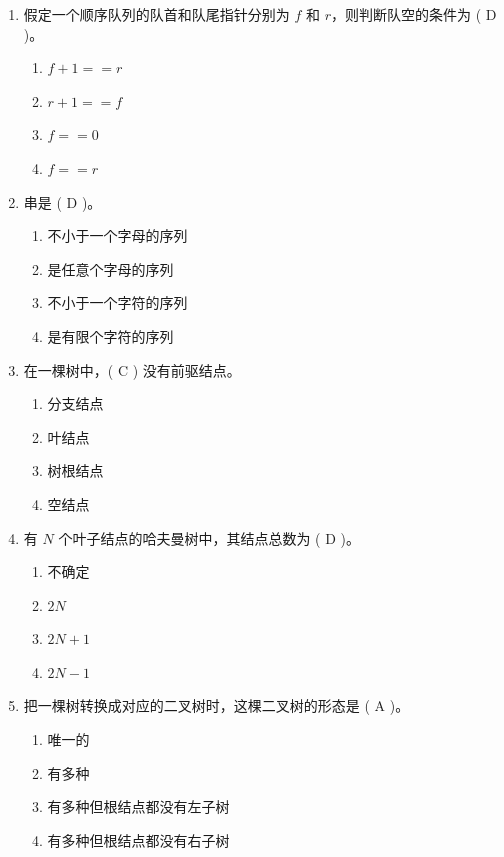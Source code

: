\documentclass[12pt, a4paper]{article}
\begin{document}
\begin{enumerate}[label=\arabic*、]
    \item 假定一个顺序队列的队首和队尾指针分别为 $f$ 和 $r$，则判断队空的条件为 ( D )。
    \begin{enumerate}
        \item $f+1==r$
        \item $r+1==f$
        \item $f==0$
        \item $f==r$
    \end{enumerate}

    \item 串是 ( D )。
    \begin{enumerate}
        \item 不小于一个字母的序列
        \item 是任意个字母的序列
        \item 不小于一个字符的序列
        \item 是有限个字符的序列
    \end{enumerate}

    \item 在一棵树中，( C ) 没有前驱结点。
    \begin{enumerate}
        \item 分支结点
        \item 叶结点
        \item 树根结点
        \item 空结点
    \end{enumerate}

    \item 有 $N$ 个叶子结点的哈夫曼树中，其结点总数为 ( D )。
    \begin{enumerate}
        \item 不确定
        \item $2N$
        \item $2N+1$
        \item $2N-1$
    \end{enumerate}

    \item 把一棵树转换成对应的二叉树时，这棵二叉树的形态是 ( A )。
    \begin{enumerate}
        \item 唯一的
        \item 有多种
        \item 有多种但根结点都没有左子树
        \item 有多种但根结点都没有右子树
    \end{enumerate}


\end{enumerate}
\end{document}

